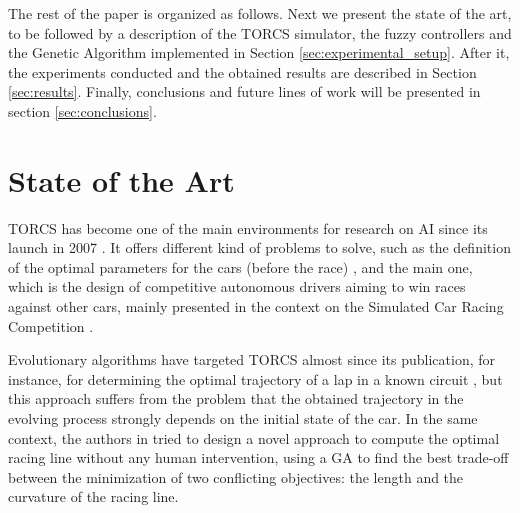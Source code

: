 \documentclass[conference]{IEEEtran}
\begin{document}

The rest of the paper is organized as follows. Next we present the
state of the art, to be followed by a description of the TORCS
simulator, the fuzzy controllers and the Genetic Algorithm implemented in Section \ref{sec:experimental_setup}. After it, the experiments conducted and the obtained results are described in Section \ref{sec:results}. Finally, conclusions and future lines of work will be presented in section \ref{sec:conclusions}.


\section{State of the Art}
\label{sec:soa}

TORCS has become one of the main environments for research on AI since its launch in 2007 \cite{WebTORCS}. It offers different kind of problems to solve, such as the definition of the optimal parameters for the cars (before the race) \cite{Kole-ParamCarTunning12}, and the main one, which is the design of competitive autonomous drivers aiming to win races against other cars, mainly presented in the context on the Simulated Car Racing Competition \cite{SimulatedCarRacing-2008}.

Evolutionary algorithms have targeted TORCS almost since its
publication, for instance, for determining the
optimal trajectory of a lap in a known circuit \cite{drivingGA2008},
but this approach suffers from the problem that the obtained
trajectory in the evolving process strongly depends on the initial
state of the car.  
In the same context, the authors in \cite{GaRaceLine2010} tried to design a novel approach to compute the optimal racing line without any human intervention, using a GA to find the best trade-off between
the minimization of two conflicting objectives: the length and
the curvature of the racing line.
\end{document}
